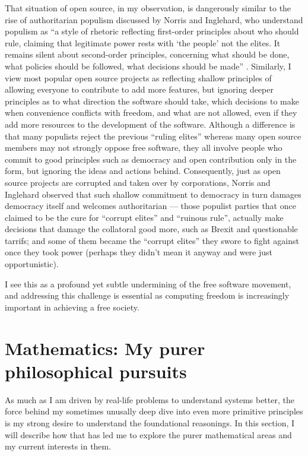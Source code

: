 \documentclass[10pt]{article}
\begin{document}
That situation of open source, in my observation, is dangerously similar to the
rise of authoritarian populism discussed by Norris and Inglehard, who
understand populism as ``a style of rhetoric reflecting first-order principles
about who should rule, claiming that legitimate power rests with `the people'
not the elites. It remains silent about second-order principles, concerning
what should be done, what policies should be followed, what decisions should be
made'' \cite[p.~4]{cultural.backlash}. Similarly, I view most popular open
source projects as reflecting shallow principles of allowing everyone to
contribute to add more features, but ignoring deeper principles as to what
direction the software should take, which decisions to make when convenience
conflicts with freedom, and what are not allowed, even if they add more
resources to the development of the software. Although a difference is that
many populists reject the previous ``ruling elites'' whereas many open source
members may not strongly oppose free software, they all involve people who
commit to good principles such as democracy and open contribution only in the
form, but ignoring the ideas and actions behind.  Consequently, just as open
source projects are corrupted and taken over by corporations, Norris and
Inglehard observed that such shallow commitment to democracy in turn damages
democracy itself and welcomes authoritarian \cite{cultural.backlash} --- those
populist parties that once claimed to be the cure for ``corrupt elites'' and
``ruinous rule'', actually make decisions that damage the collatoral good more,
such as Brexit and questionable tarrifs; and some of them became the ``corrupt
elites'' they swore to fight against once they took power (perhaps they didn't
mean it anyway and were just opportunistic).

I see this as a profound yet subtle undermining of the free software movement,
and addressing this challenge is essential as computing freedom is increasingly
important in achieving a free society.


\section[Mathematics]{Mathematics: My purer philosophical pursuits}
\label{sec.math}
As much as I am driven by real-life problems to understand systems better, the
force behind my sometimes unusally deep dive into even more primitive
principles is my strong desire to understand the foundational reasonings. In
this section, I will describe how that has led me to explore the purer
mathematical areas and my current interests in them.
\end{document}
